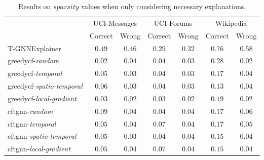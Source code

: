 \begin{table}[ht]
    \centering
    \small
    \begin{tabular}{lcccccc}
    \hline
         &  \multicolumn{2}{c}{UCI-Messages}&  \multicolumn{2}{c}{UCI-Forums}&  \multicolumn{2}{c}{Wikipedia}\\
         &  Correct&  Wrong&  Correct&  Wrong&  Correct& Wrong\\
         \hline
         T-GNNExplainer&  $0.49$&  $0.46$&  $0.29$&  $0.32$&  $0.76$& $0.58$\\
         \gls{greedycf}-\textit{random}&  $0.02$&  $0.04$&  $0.04$&  $0.03$&  $0.28$& $0.02$\\
         \gls{greedycf}-\textit{temporal}&  $0.05$&  $0.03$&  $0.04$&  $0.03$&  $0.17$& $0.04$\\
         \gls{greedycf}-\textit{spatio-temporal}&  $0.06$&  $0.03$&  $0.04$&  $0.03$&  $0.13$& $0.04$\\
         \gls{greedycf}-\textit{local-gradient}&  $0.03$&  $0.02$&  $0.03$&  $0.02$&  $0.19$& $0.02$\\
         \gls{cftgnn}-\textit{random}&  $0.09$&  $0.04$&  $0.04$&  $0.04$&  $0.17$& $0.06$\\
         \gls{cftgnn}-\textit{temporal}&  $0.05$&  $0.04$&  $0.07$&  $0.04$&  $0.17$& $0.05$\\
         \gls{cftgnn}-\textit{spatio-temporal}&  $0.05$&  $0.03$&  $0.04$&  $0.04$&  $0.15$& $0.04$\\
 \gls{cftgnn}-\textit{local-gradient}& $0.05$& $0.04$& $0.07$& $0.04$& $0.15$&$0.04$\\
 \hline
    \end{tabular}
    \caption{Results on $sparsity$ values when only considering necessary explanations.}
    \label{t_spar_nec}
\end{table}


